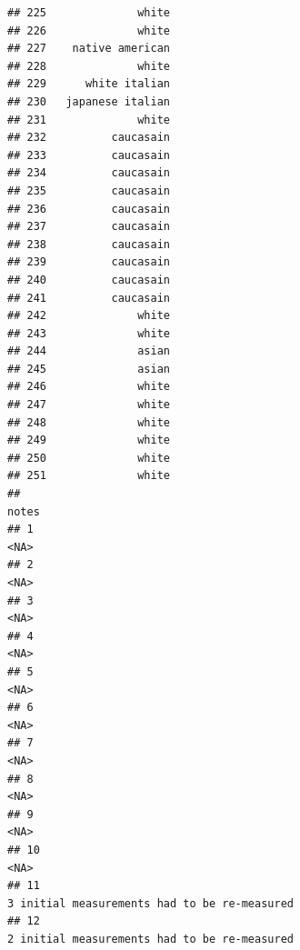\documentclass[]{article}
\begin{document}
\begin{verbatim}
## 225              white
## 226              white
## 227    native american
## 228              white
## 229      white italian
## 230   japanese italian
## 231              white
## 232          caucasain
## 233          caucasain
## 234          caucasain
## 235          caucasain
## 236          caucasain
## 237          caucasain
## 238          caucasain
## 239          caucasain
## 240          caucasain
## 241          caucasain
## 242              white
## 243              white
## 244              asian
## 245              asian
## 246              white
## 247              white
## 248              white
## 249              white
## 250              white
## 251              white
##                                                                                                                                                   notes
## 1                                                                                                                                                  <NA>
## 2                                                                                                                                                  <NA>
## 3                                                                                                                                                  <NA>
## 4                                                                                                                                                  <NA>
## 5                                                                                                                                                  <NA>
## 6                                                                                                                                                  <NA>
## 7                                                                                                                                                  <NA>
## 8                                                                                                                                                  <NA>
## 9                                                                                                                                                  <NA>
## 10                                                                                                                                                 <NA>
## 11                                                                                                         3 initial measurements had to be re-measured
## 12                                                                                                         2 initial measurements had to be re-measured

\end{verbatim}
\end{document}
